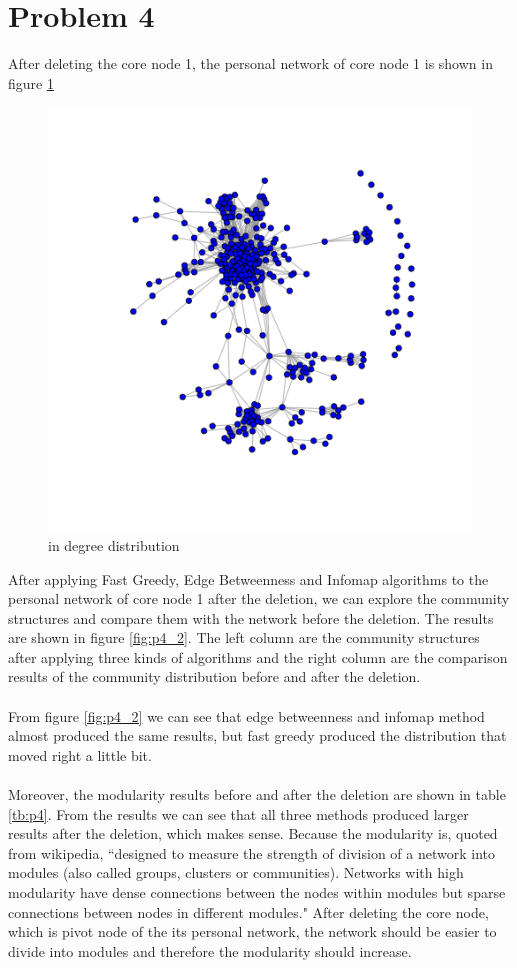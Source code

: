 \documentclass{article}
\begin{document}
\section{Problem 4}
After deleting the core node 1, the personal network of core node 1 is shown in figure \ref{fig:p4_1}
\begin{figure}[htbp]
\centering
\includegraphics[width=.8\textwidth]{p4_1.png}
\caption{in degree distribution}
\label{fig:p4_1}
\end{figure}
After applying Fast Greedy, Edge Betweenness and Infomap algorithms to the personal network of core node 1 after the deletion, we can explore the community structures and compare them with the network before the deletion. The results are shown in figure \ref{fig:p4_2}. The left column are the community structures after applying three kinds of algorithms and the right column are the comparison results of the community distribution before and after the deletion.\\
\\
 From figure \ref{fig:p4_2} we can see that edge betweenness and infomap method almost produced the same results, but fast greedy produced the distribution that moved right a little bit. \\
 \\
 Moreover, the modularity results before and after the deletion are shown in table \ref{tb:p4}. From the results we can see that all three methods produced larger results after the deletion, which makes sense. Because the modularity is, quoted from wikipedia, ``designed to measure the strength of division of a network into modules (also called groups, clusters or communities). Networks with high modularity have dense connections between the nodes within modules but sparse connections between nodes in different modules." After deleting the core node, which is pivot node of the its personal network, the network should be easier to divide into modules and therefore the modularity should increase.
\end{document}
